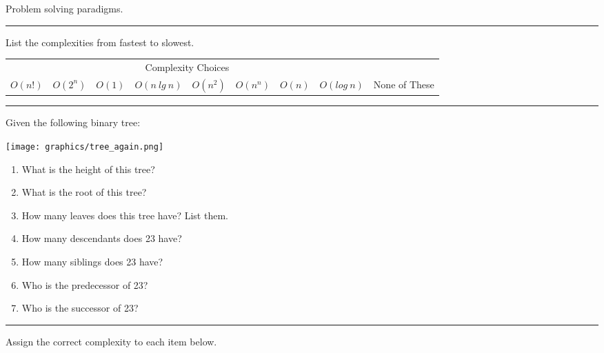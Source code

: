 \documentclass[12pt]{exam}
\newcommand{\seperate}{\begin{center}\noindent\rule{18cm}{0.75pt}\end{center}}
\begin{document}
\begin{questions}
    \question[15] Problem solving paradigms.


    \seperate

    \question[20]List the complexities from fastest to slowest.

    \begin{tabular}{ c  c  c  c  c  c  c  c c }
        \multicolumn{8}{c}{Complexity Choices} \\
        $O(n!)$ & $O(2^n)$ & $O(1)$ & $O(n\ lg\ n)$ & $O(n^2)$ & $O(n^n)$ & $O(n)$ & $O(log\ n)$ & None of These \\
    \end{tabular}


    \seperate

    \question[20] Given the following binary tree:

    \texttt{[image: graphics/tree\_again.png]}

    \begin{enumerate}
        \item What is the height of this tree?
        \item What is the root of this tree?
        \item How many leaves does this tree have? List them.
        \item How many descendants does 23 have?
        \item How many siblings does 23 have?
        \item Who is the predecessor of 23?
        \item Who is the successor of 23?
    \end{enumerate}

    \seperate

    \question[20]Assign the correct complexity to each item below.


\end{questions}
\end{document}
